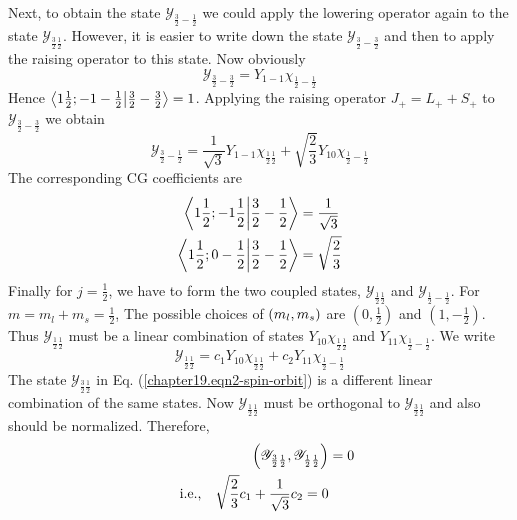 Next, to obtain the state $\mathcal{Y}_{\frac{3}{2}-\frac{1}{2}}$ we could apply the lowering operator again to the state $\mathcal{Y}_{\frac{3}{2}\frac{1}{2}}$. However, it is easier to write down the state $\mathcal{Y}_{\frac{3}{2}-\frac{3}{2}}$ and then to apply the raising operator to this state. Now obviously
\begin{equation}
\label{chapter19.eqn3-spin-orbit}
\mathcal{Y}_{\frac{3}{2}-\frac{3}{2}} = Y_{1 -1}\chi_{\frac{1}{2}-\frac{1}{2}}
\end{equation}
Hence $\braket{1 \frac{1}{2}; -1 -\frac{1}{2}}{\frac{3}{2}-\frac{3}{2}} = 1$. Applying the raising operator $J_{+} = L_{+} + S_{+}$ to $\mathcal{Y}_{\frac{3}{2}-\frac{3}{2}}$ we obtain
\begin{equation}
\label{chapter19.eqn4-spin-orbit}
\mathcal{Y}_{\frac{3}{2}-\frac{1}{2}} = \frac{1}{\sqrt{3}} Y_{1 -1} \chi_{\frac{1}{2}\frac{1}{2}} + \sqrt{\frac{2}{3}} Y_{1 0}\chi_{\frac{1}{2}-\frac{1}{2}}
\end{equation}
The corresponding CG coefficients are
\begin{align*}
\braket{1 \frac{1}{2};-1\frac{1}{2}}{\frac{3}{2}-\frac{1}{2}} &= \frac{1}{\sqrt{3}} \\
\braket{1\frac{1}{2};0-\frac{1}{2}}{\frac{3}{2}-\frac{1}{2}} &= \sqrt{\frac{2}{3}}
\end{align*}
Finally for $j=\frac{1}{2}$, we have to form the two coupled states, $\mathcal{Y}_{\frac{1}{2}\frac{1}{2}}$ and $\mathcal{Y}_{\frac{1}{2}-\frac{1}{2}}$. For $m=m_l + m_s = \frac{1}{2}$, The possible choices of $\qty(m_l, m_s)$ are $(0,\frac{1}{2})$ and $(1,-\frac{1}{2})$. Thus $\mathcal{Y}_{\frac{1}{2}\frac{1}{2}}$ must be a linear combination of states $Y_{1 0}\chi_{\frac{1}{2}\frac{1}{2}}$ and $Y_{1 1}\chi_{\frac{1}{2}-\frac{1}{2}}$. We write
\begin{equation}
\mathcal{Y}_{\frac{1}{2}\frac{1}{2}} = c_1 Y_{1 0}\chi_{\frac{1}{2}\frac{1}{2}} + c_2 Y_{1 1}\chi_{\frac{1}{2}-\frac{1}{2}}
\end{equation}
The state $\mathcal{Y}_{\frac{3}{2}\frac{1}{2}}$ in Eq. (\ref{chapter19.eqn2-spin-orbit}) is a different linear combination of the same states. Now $\mathcal{Y}_{\frac{1}{2}\frac{1}{2}}$ must be orthogonal to $\mathcal{Y}_{\frac{3}{2}\frac{1}{2}}$ and also should be normalized. Therefore,
\begin{align}
\qty(\mathcal{Y}_{\frac{3}{2}\frac{1}{2}},\mathcal{Y}_{\frac{1}{2}\frac{1}{2}}) &= 0 \nonumber\\
\label{chapter19.eqn5-spin-orbit}
\qq{i.e.,}\sqrt{\frac{2}{3}} c_1 + \frac{1}{\sqrt{3}} c_2 = 0
\end{align}
